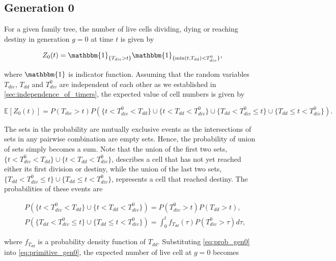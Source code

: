 \documentclass[11pt, a4paper]{article}
\begin{document}
\subsection{Generation 0}
\linenumbers
For a given family tree, the number of live cells dividing, dying or reaching destiny in generation $g=0$ at time $t$ is given by
\begin{linenomath*}
    \begin{equation*}
        Z_0(t) = \mathbbm{1}_{\{T_{die} > t\}} \mathbbm{1}_{\{\min(t, T_{dd}) < T_{div}^0\}},
    \end{equation*}
\end{linenomath*}
where $\mathbbm{1}$ is indicator function. Assuming that the random variables $T_{die}$, $T_{dd}$ and $T_{div}^0$ are independent of each other as we established in \cref{sec:independence_of_timers}, the expected value of cell numbers is given by
\begin{linenomath*} 
    \begin{equation}
        \label{eq:primitive_gen0}
        \mathbb{E}[Z_0(t)] = P(T_{die} > t) P(\{t < T_{div}^0 < T_{dd}\} \cup \{t < T_{dd} < T_{div}^0\} \cup \{T_{dd} < T_{div}^0 \leq t\} \cup \{T_{dd} \leq t < T_{div}^0\}).
    \end{equation}
\end{linenomath*}
The sets in the probability are mutually exclusive events as the intersections of sets in any pairwise combination are empty sets. Hence, the probability of union of sets simply becomes a sum. Note that the union of the first two sets, $\{t < T_{div}^0 < T_{dd}\} \cup \{t < T_{dd} < T_{div}^0\}$, describes a cell that has not yet reached either its first division or destiny, while the union of the last two sets, $\{T_{dd} < T_{div}^0 \leq t\} \cup \{T_{dd} \leq t < T_{div}^0\}$, represents a cell that reached destiny. The probabilities of these events are
\begin{linenomath*}
    \begin{equation}
    \label{eq:prob_gen0}
    \begin{aligned}
        & P(\{t < T_{div}^0 < T_{dd}\} \cup \{t < T_{dd} < T_{div}^0\}) = P(T_{div}^0 > t)P(T_{dd} > t), \\
        & P(\{T_{dd} < T_{div}^0 \leq t\} \cup \{T_{dd} \leq t < T_{div}^0\}) = \int_0^t f_{T_{dd}}(\tau)P(T_{div}^0 > \tau) d\tau,
    \end{aligned}
    \end{equation}
\end{linenomath*}
where $f_{T_{dd}}$ is a probability density function of $T_{dd}$. Substituting \cref{eq:prob_gen0} into \cref{eq:primitive_gen0}, the expected number of live cell at $g=0$ becomes
\end{document}
